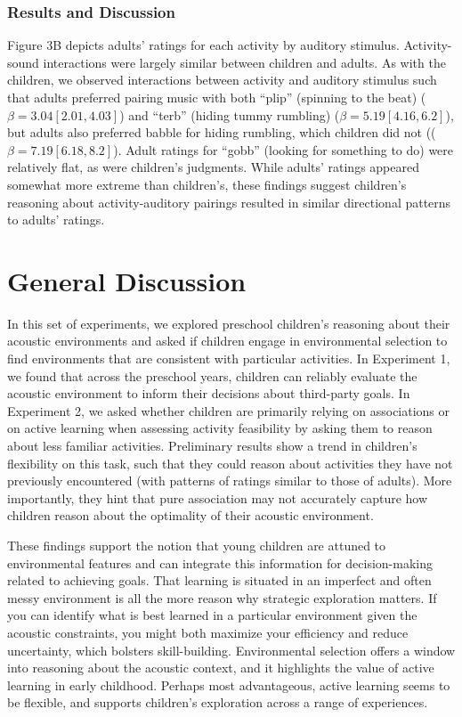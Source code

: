 \documentclass[10pt, letterpaper]{article}
\begin{document}
\hypertarget{results-and-discussion-2}{%
\subsubsection{Results and Discussion}\label{results-and-discussion-2}}

Figure 3B depicts adults' ratings for each activity by auditory
stimulus. Activity-sound interactions were largely similar between
children and adults. As with the children, we observed interactions
between activity and auditory stimulus such that adults preferred
pairing music with both ``plip'' (spinning to the beat)
(\(\beta = 3.04 [2.01, 4.03]\)) and ``terb'' (hiding tummy rumbling)
(\(\beta = 5.19 [4.16, 6.2]\)), but adults also preferred babble for
hiding rumbling, which children did not ((\(\beta = 7.19 [6.18, 8.2]\)).
Adult ratings for ``gobb'' (looking for something to do) were relatively
flat, as were children's judgments. While adults' ratings appeared
somewhat more extreme than children's, these findings suggest children's
reasoning about activity-auditory pairings resulted in similar
directional patterns to adults' ratings.

\hypertarget{general-discussion}{%
\section{General Discussion}\label{general-discussion}}

In this set of experiments, we explored preschool children's reasoning
about their acoustic environments and asked if children engage in
environmental selection to find environments that are consistent with
particular activities. In Experiment 1, we found that across the
preschool years, children can reliably evaluate the acoustic environment
to inform their decisions about third-party goals. In Experiment 2, we
asked whether children are primarily relying on associations or on
active learning when assessing activity feasibility by asking them to
reason about less familiar activities. Preliminary results show a trend
in children's flexibility on this task, such that they could reason
about activities they have not previously encountered (with patterns of
ratings similar to those of adults). More importantly, they hint that
pure association may not accurately capture how children reason about
the optimality of their acoustic environment.

These findings support the notion that young children are attuned to
environmental features and can integrate this information for
decision-making related to achieving goals. That learning is situated in
an imperfect and often messy environment is all the more reason why
strategic exploration matters. If you can identify what is best learned
in a particular environment given the acoustic constraints, you might
both maximize your efficiency and reduce uncertainty, which bolsters
skill-building. Environmental selection offers a window into reasoning
about the acoustic context, and it highlights the value of active
learning in early childhood. Perhaps most advantageous, active learning
seems to be flexible, and supports children's exploration across a range
of experiences.
\end{document}
